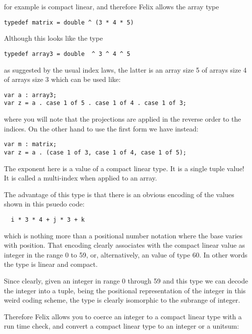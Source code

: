 \documentclass[oneside]{book}
\begin{document}
for example is compact linear, and therefore Felix allows the array type

\begin{verbatim}
typedef matrix = double ^ (3 * 4 * 5)
\end{verbatim}

Although this looks like the type

\begin{verbatim}
typedef array3 = double  ^ 3 ^ 4 ^ 5
\end{verbatim}

as suggested by the usual index laws, the latter is an array size 5 of
arrays size 4 of arrays size 3 which can be used like:

\begin{verbatim}
var a : array3;
var z = a . case 1 of 5 . case 1 of 4 . case 1 of 3;
\end{verbatim}

where you will note that the projections are applied in the reverse
order to the indices. On the other hand to use the first form we have
instead:

\begin{verbatim}
var m : matrix;
var z = a . (case 1 of 3, case 1 of 4, case 1 of 5);
\end{verbatim}

The exponent here is a value of a compact linear type.
It is a single tuple value! It is called a multi-index
when applied to an array.

The advantage of this type is that there is an obvious
encoding of the values shown in this psuedo code:

\begin{verbatim}
  i * 3 * 4 + j * 3 + k
\end{verbatim}

which is nothing more than a positional number notation where the
base varies with position. That encoding clearly associates
with the compact linear value as integer in the range 0 to 59,
or, alternatively, an value of type 60. In other words the type
is linear and compact.

Since clearly, given an integer in range 0 through 59 and this type
we can decode the integer into a tuple, being the positional representation
of the integer in this weird coding scheme, the type is clearly
isomorphic to the subrange of integer.

Therefore Felix allows you to coerce an integer to a compact linear
type with a run time check, and convert a compact linear type
to an integer or a unitsum:
\end{document}
